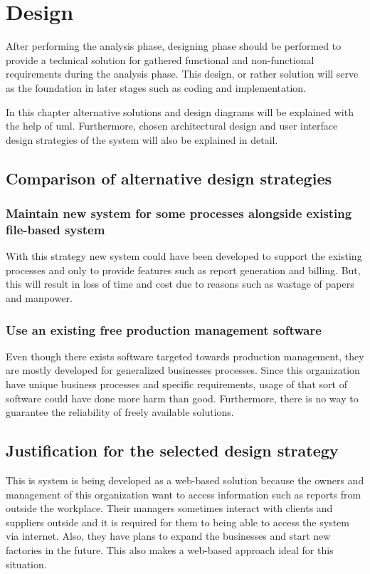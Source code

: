 \documentclass[12pt]{report}
\begin{document}
\newpage
\chapter{Design}
After performing the analysis phase, designing phase should be performed to provide a technical solution for gathered functional and non-functional requirements during the analysis phase. This design, or rather solution will serve as the foundation in later stages such as coding and implementation.

In this chapter alternative solutions and design diagrams will be explained with the help of \acrshort{uml}. Furthermore, chosen architectural design and user interface design strategies of the system will also be explained in detail.

\section{Comparison of alternative design strategies}

\subsection{Maintain new system for some processes alongside existing file-based system}
With this strategy new system could have been developed to support the existing processes and only to provide features such as report generation and billing. But, this will result in loss of time and cost due to reasons such as wastage of papers and manpower.

\subsection{Use an existing free production management software}
Even though there exists software targeted towards production management, they are mostly developed for generalized businesses processes. Since this organization have unique business processes and specific requirements, usage of that sort of software could have done more harm than good. Furthermore, there is no way to guarantee the reliability of freely available solutions.

\section{Justification for the selected design strategy}
This is system is being developed as a web-based solution because the owners and management of this organization want to access information such as reports from outside the workplace. Their managers sometimes interact with clients and suppliers outside and it is required for them to being able to access the system via internet. Also, they have plans to expand the businesses and start new factories in the future. This also makes a web-based approach ideal for this situation.
\end{document}
